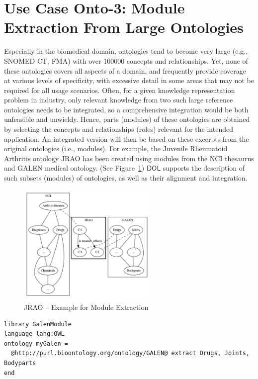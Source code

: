 \documentclass[10pt,fleqn,final]{scrreprt}
\newcommand*{\DOL}{\ensuremath{\mathsf{DOL}}\xspace}
\newcommand{\figurerefname}{Figure}
\newcommand{\fref}[1]{\figurerefname~\ref{#1}}
\newenvironment{definitions}[0]{\medskip }{}
\begin{document}
\begin{definitions}
\section{Use Case Onto-3: Module Extraction From Large Ontologies}\label{onto-3}
Especially in the biomedical domain, ontologies tend to become very large (e.g., SNOMED CT, FMA) 
with over 100000 concepts and relationships. Yet, none of these ontologies covers all aspects of a 
domain, and frequently provide coverage at various levels of specificity, with excessive detail in 
some areas that may not be required for all usage scenarios. Often, for a given knowledge 
representation problem in industry, only relevant knowledge from two such large reference 
ontologies needs to be integrated, so a comprehensive integration would be both unfeasible and 
unwieldy. Hence, parts (modules) of these ontologies are obtained by selecting the concepts and 
relationships (roles) relevant for the intended application. An integrated version will then be 
based on these excerpts from the original ontologies (i.e., modules). For example, the Juvenile 
Rheumatoid Arthritis ontology JRAO has been created using modules from the NCI thesaurus and GALEN 
medical ontology. (See \fref{JRAO}) \DOL  
supports the description of such subsets (modules) of ontologies, as well as their alignment and 
integration.


\begin{figure}[htbp]
\begin{center}
\includegraphics[width=0.6\textwidth]{useCaseOnto3.png}
\caption{JRAO  -- Example for Module Extraction}
\label{JRAO}
\end{center}
\end{figure}


\begin{lstlisting}[basicstyle=\ttfamily,language=dolText,escapechar=@,mathescape]
%prefix( lang:  <http://purl.net/DOL/languages/> )%
library GalenModule
language lang:OWL
ontology myGalen = 
  @http://purl.bioontology.org/ontology/GALEN@ extract Drugs, Joints, Bodyparts
end


\end{lstlisting}
\end{definitions}
\end{document}

